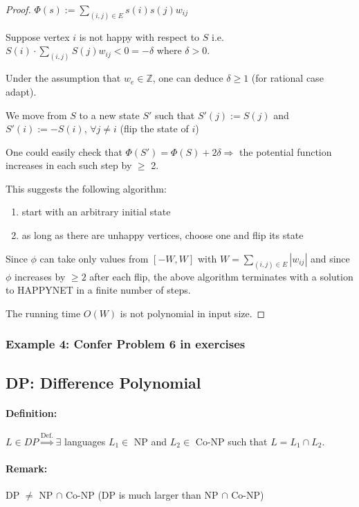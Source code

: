 \documentclass[11pt]{article}
\theoremstyle{definition}
\theoremstyle{definition}
\begin{document}
\begin{proof}
$ \Phi (s) := \sum \limits_{(i, j) \in E} s(i) s(j) w_{ij} $

Suppose vertex $ i $ is not happy with respect to $ S $ i.e. $ S(i) \cdot \sum \limits_{(i, j)} S(j) w_{ij} < 0 = - \delta $ where $ \delta > 0 $.

Under the assumption that $ w_e \in \mathbb{Z} $, one can deduce $ \delta \geq 1 $ (for rational case adapt).

We move from $ S $ to a new state $ S' $ such that $ S' (j) := S (j) $ and $ S' (i) := - S (i)$, $ \forall j \neq i $ (flip the state of $ i $) 

One could easily check that $ \Phi (S') = \Phi (S) + 2 \delta \Rightarrow $ the potential function increases in each such step by $ \geq $ 2.

This suggests the following algorithm:
\begin{enumerate}
\item start with an arbitrary initial state
\item as long as there are unhappy vertices, choose one and flip its state
\end{enumerate}
Since $ \phi $ can take only values from $ [-W, W] $ with $ W = \sum \limits_{(i, j) \in E} |w_{ij}| $ and since $ \phi $ increases by $ \geq 2 $ after each flip, the above algorithm terminates with a solution to HAPPYNET in a finite number of steps.

The running time $ O(W) $ is not polynomial in input size.
\end{proof}

\subsubsection{Example 4: Confer Problem 6 in exercises}


\subsection{DP: Difference Polynomial}
\paragraph{Definition:} $ L \in DP \overset{\text{Def.}}{\Rightarrow} \exists $ languages $ L_1 \in $ NP and $ L_2 \in $ Co-NP such that $ L = L_1 \cap L_2 $.

\paragraph{Remark:} DP $ \neq $ NP $ \cap $ Co-NP (DP is much larger than NP $ \cap $ Co-NP)
\end{document}
